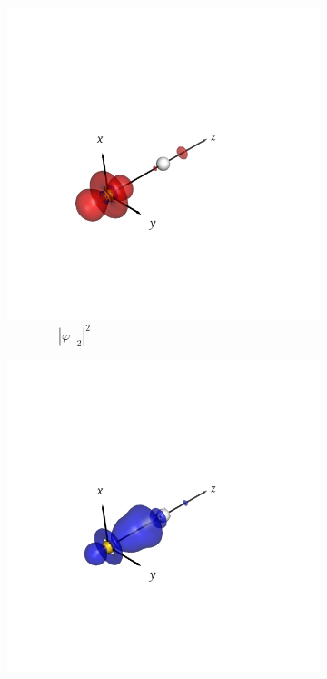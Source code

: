 \documentclass[journal=inoraj,manuscript=article]{achemso}
\begin{document}
\begin{figure}[!h]
    \vspace{0.0cm}
    \begin{subfigure}[t]{0.32\textwidth}
        \centering
        \includegraphics[width=\linewidth]{./AuFl+/nocv-3.png}
        \caption*{\ \ \ \ \ \ \ \ $|\varphi_{-2}|^2$}
    \end{subfigure}
    \hfill
    \begin{subfigure}[t]{0.32\textwidth}
        \centering
        \includegraphics[width=\linewidth]{./AuFl+/nocv+3.png}

\end{subfigure}
\end{figure}
\end{document}
